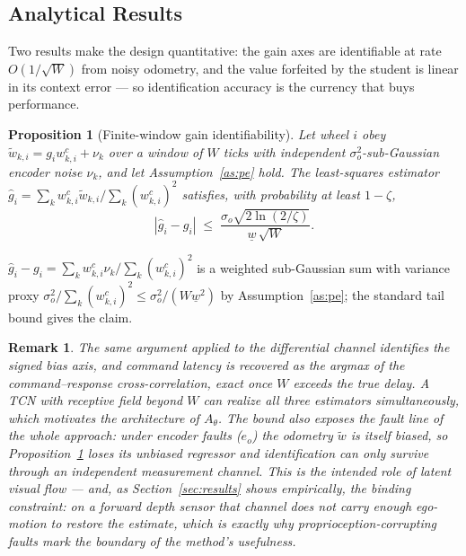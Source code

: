 \documentclass[journal]{IEEEtran}
\newtheorem{proposition}{Proposition}
\newtheorem{remark}{Remark}
\begin{document}
\subsection{Analytical Results}\label{sec:analysis}
Two results make the design quantitative: the gain axes are identifiable at
rate $O(1/\sqrt{W})$ from noisy odometry, and the value forfeited by the
student is linear in its context error --- so identification accuracy is
the currency that buys performance.

\begin{proposition}[Finite-window gain identifiability]\label{prop:id}
Let wheel $i$ obey $\tilde{w}_{k,i} = g_i w^{c}_{k,i} + \nu_k$ over a window
of $W$ ticks with independent $\sigma_o^2$-sub-Gaussian encoder noise
$\nu_k$, and let Assumption~\ref{as:pe} hold. The least-squares estimator
$\hat{g}_i = \sum_k w^{c}_{k,i} \tilde{w}_{k,i} / \sum_k (w^{c}_{k,i})^2$
satisfies, with probability at least $1 - \zeta$,
\begin{equation}
|\hat{g}_i - g_i| \;\le\; \frac{\sigma_o \sqrt{2 \ln(2/\zeta)}}
{\underline{w}\, \sqrt{W}} .
\end{equation}
\end{proposition}
\begin{IEEEproof}
$\hat{g}_i - g_i = \sum_k w^{c}_{k,i}\nu_k / \sum_k (w^{c}_{k,i})^2$ is a
weighted sub-Gaussian sum with variance proxy
$\sigma_o^2 / \sum_k (w^{c}_{k,i})^2 \le \sigma_o^2 / (W\underline{w}^2)$
by Assumption~\ref{as:pe}; the standard tail bound gives the claim.
\end{IEEEproof}

\begin{remark}\label{rem:id}
The same argument applied to the differential channel identifies the signed
bias axis, and command latency is recovered as the argmax of the
command--response cross-correlation, exact once $W$ exceeds the true delay.
A TCN with receptive field beyond $W$ can realize all three estimators
simultaneously, which motivates the architecture of $A_\theta$. The bound
also exposes the fault line of the whole approach: under encoder faults
($e_o$) the odometry $\tilde{w}$ is itself biased, so
Proposition~\ref{prop:id} loses its unbiased regressor and identification can
only survive through an \emph{independent} measurement channel. This is the
intended role of latent visual flow --- and, as
Section~\ref{sec:results} shows empirically, the binding constraint: on a
forward depth sensor that channel does not carry enough ego-motion to restore
the estimate, which is exactly why proprioception-corrupting faults mark the
boundary of the method's usefulness.
\end{remark}
\end{document}
